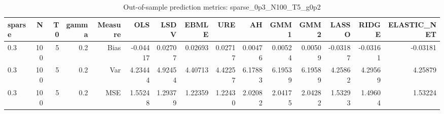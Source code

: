 \begin{table}[!htbp]\centering
\caption{Out-of-sample prediction metrics: sparse_0p3_N100_T5_g0p2}
\label{tab:table3_sparse_0p3_N100_T5_g0p2}
\begin{tabular}{lrrrrrrrrrrrrrr}
\hline
sparse & N & T0 & gamma & Measure & OLS & LSDV & EBMLE & URE & AH & GMM1 & GMM2 & LASSO & RIDGE & ELASTIC_NET \\
\hline
0.3 & 100 & 5 & 0.2 & Bias & -0.04417 & 0.02707 & 0.02693 & 0.02717 & 0.00476 & 0.00524 & 0.00509 & -0.03187 & -0.03161 & -0.03181 \\
0.3 & 100 & 5 & 0.2 & Var & 4.23444 & 4.92454 & 4.40713 & 4.42257 & 6.17883 & 6.19539 & 6.19589 & 4.25862 & 4.29569 & 4.25879 \\
0.3 & 100 & 5 & 0.2 & MSE & 1.55248 & 1.29379 & 1.22359 & 1.22430 & 2.02082 & 2.04175 & 2.04282 & 1.53293 & 1.49604 & 1.53224 \\
\hline
\end{tabular}
\end{table}

